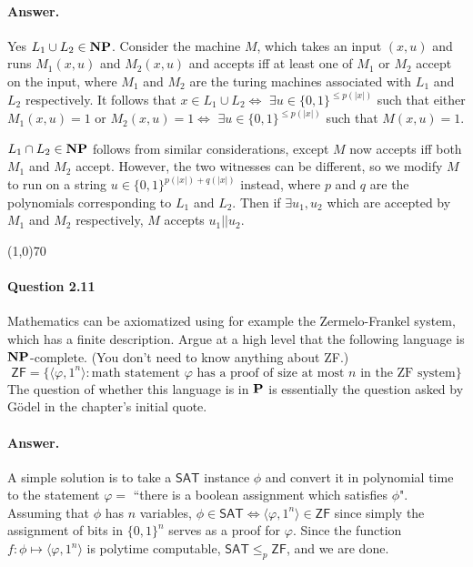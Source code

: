 \paragraph{Answer.} Yes $L_1\cup L_2\in\mathbf{NP}$. Consider the machine $M$, which takes an input $(x,u)$ and runs $M_1(x,u)$ and $M_2(x,u)$ and accepts iff at least one of $M_1$ or $M_2$ accept on the input, where $M_1$ and $M_2$ are the turing machines associated with $L_1$ and $L_2$ respectively. It follows that $x\in L_1\cup L_2\iff$ $\exists u\in\{0,1\}^{\leq p(|x|)}$ such that either $M_1(x,u)=1$ or $M_2(x,u)=1\iff$ $\exists u\in\{0,1\}^{\leq p(|x|)}$ such that $M(x,u)=1$.

$L_1\cap L_2\in\mathbf{NP}$ follows from similar considerations, except $M$ now accepts iff both $M_1$ and $M_2$ accept. However, the two witnesses can be different, so we modify $M$ to run on a string $u\in\{0,1\}^{p(|x|)+q(|x|)}$ instead, where $p$ and $q$ are the polynomials corresponding to $L_1$ and $L_2$. Then if $\exists u_1, u_2$ which are accepted by $M_1$ and $M_2$ respectively, $M$ accepts $u_1||u_2$.

\begin{center}
	\line(1,0){70}
\end{center}

\paragraph{Question 2.11} Mathematics can be axiomatized using for example the Zermelo-Frankel system, which has a finite description. Argue at a high level that the following language is $\mathbf{NP}$-complete. (You don't need to know anything about ZF.)
\begin{equation*}
	\mathsf{ZF}=\{\langle\varphi, 1^n\rangle:\text{math statement $\varphi$ has a proof of size at most $n$ in the ZF system}\}
\end{equation*}
The question of whether this language is in $\mathbf{P}$ is essentially the question asked by
Gödel in the chapter’s initial quote.

\paragraph{Answer.} A simple solution is to take a $\mathsf{SAT}$ instance $\phi$ and convert it in polynomial time to the statement $\varphi=$ ``there is a boolean assignment which satisfies $\phi$". Assuming that $\phi$ has $n$ variables, $\phi\in\mathsf{SAT}\iff\langle\varphi, 1^n\rangle\in \mathsf{ZF}$ since simply the assignment of bits in $\{0,1\}^n$ serves as a proof for $\varphi$. Since the function $f:\phi\mapsto\langle\varphi, 1^n\rangle$ is polytime computable, $\mathsf{SAT}\leq_p\mathsf{ZF}$, and we are done.

